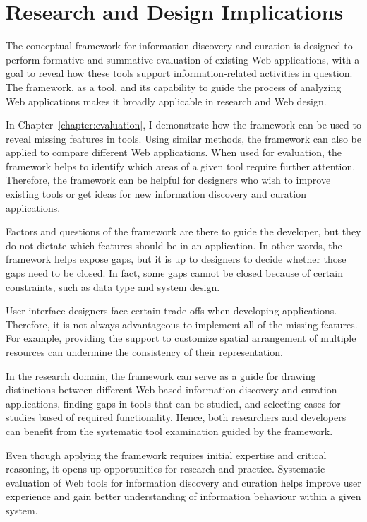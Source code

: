 \chapter{Research and Design Implications}
\label{chapter:implications}

The conceptual framework for information discovery and curation is designed to perform formative and summative evaluation of existing Web applications, with a goal to reveal how these tools support information-related activities in question. The framework, as a tool, and its capability to guide the process of analyzing Web applications makes it broadly applicable in research and Web design. 

In Chapter~\ref{chapter:evaluation}, I demonstrate how the framework can be used to reveal missing features in tools. Using similar methods, the framework can also be applied to compare different Web applications. When used for evaluation, the framework helps to identify which areas of a given tool require further attention. Therefore, the framework can be helpful for designers who wish to improve existing tools or get ideas for new information discovery and curation applications. 

Factors and questions of the framework are there to guide the developer, but they do not dictate which features should be in an application. In other words, the framework helps expose gaps, but it is up to designers to decide whether those gaps need to be closed. In fact, some gaps cannot be closed because of certain constraints, such as data type and system design.

User interface designers face certain trade-offs when developing applications. Therefore, it is not always advantageous to implement all of the missing features. For example, providing the support to customize spatial arrangement of multiple resources can undermine the consistency of their representation. 

In the research domain, the framework can serve as a guide for drawing distinctions between different Web-based information discovery and curation applications, finding gaps in tools that can be studied, and selecting cases for studies based of required functionality. Hence, both researchers and developers can benefit from the systematic tool examination guided by the framework.

Even though applying the framework requires initial expertise and critical reasoning, it opens up opportunities for research and practice. Systematic evaluation of Web tools for information discovery and curation helps improve user experience and gain better understanding of information behaviour within a given system. 




